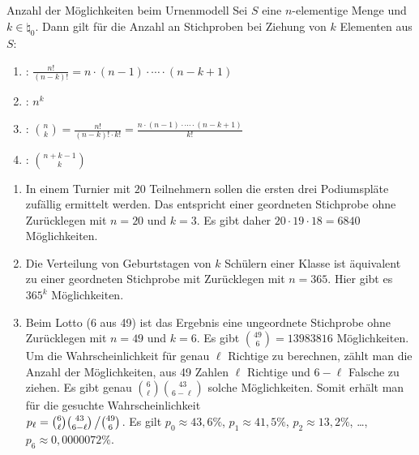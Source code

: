 \begin{Satz}{Anzahl der Möglichkeiten beim Urnenmodell}
    Sei $S$ eine $n$-elementige Menge und\\
    $k \in \natural_0$.
    Dann gilt für die Anzahl an Stichproben bei Ziehung von $k$ Elementen aus $S$:
    \begin{enumerate}
        \item
        :
        $\frac{n!}{(n - k)!} = n \cdot (n - 1) \cdot \dotsm \cdot (n - k + 1)$

        \item
        :
        $n^k$

        \item
        :
        $\binom{n}{k} = \frac{n!}{(n - k)! \cdot k!} =
        \frac{n \cdot (n - 1) \cdot \dotsm \cdot (n - k + 1)}{k!}$

        \item
        :
        $\binom{n + k - 1}{k}$
    \end{enumerate}
\end{Satz}

\begin{Bsp}
    \begin{enumerate}
        \item
        In einem Turnier mit $20$ Teilnehmern sollen die ersten drei Podiumspläte zufällig
        ermittelt werden.
        Das entspricht einer geordneten Stichprobe ohne Zurücklegen mit $n = 20$ und $k = 3$.
        Es gibt daher $20 \cdot 19 \cdot 18 = 6840$ Möglichkeiten.

        \item
        Die Verteilung von Geburtstagen von $k$ Schülern einer Klasse ist äquivalent zu
        einer geordneten Stichprobe mit Zurücklegen mit $n = 365$.
        Hier gibt es $365^k$ Möglichkeiten.

        \item
        Beim Lotto (6 aus 49) ist das Ergebnis eine ungeordnete Stichprobe ohne Zurücklegen
        mit $n = 49$ und $k = 6$.
        Es gibt $\binom{49}{6} = 13983816$ Möglichkeiten.\\
        Um die Wahrscheinlichkeit für genau $\ell$ Richtige zu berechnen, zählt man die
        Anzahl der Möglichkeiten, aus 49 Zahlen $\ell$ Richtige und $6 - \ell$ Falsche zu ziehen.
        Es gibt genau $\binom{6}{\ell} \binom{43}{6 - \ell}$ solche Möglichkeiten.
        Somit erhält man für die gesuchte Wahrscheinlichkeit\\
        $p_\ell = \binom{6}{\ell} \binom{43}{6 - \ell} \left/\binom{49}{6}\right.$.
        Es gilt $p_0 \approx 43{,}6\%$, $p_1 \approx 41{,}5\%$, $p_2 \approx 13{,}2\%$,
        \dots, $p_6 \approx 0{,}0000072\%$.
    \end{enumerate}
\end{Bsp}

